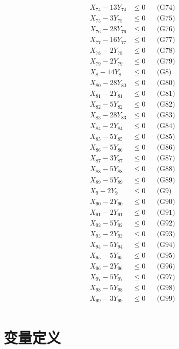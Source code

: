 \documentclass[a4paper,10pt]{article}
\begin{document}
{\begin{align}
X_{74} - 13Y_{74} &\leq 0 && \text{(G74)} \\
X_{75} - 3Y_{75} &\leq 0 && \text{(G75)} \\
X_{76} - 28Y_{76} &\leq 0 && \text{(G76)} \\
X_{77} - 16Y_{77} &\leq 0 && \text{(G77)} \\
X_{78} - 2Y_{78} &\leq 0 && \text{(G78)} \\
X_{79} - 2Y_{79} &\leq 0 && \text{(G79)} \\
X_{8} - 14Y_{8} &\leq 0 && \text{(G8)} \\
X_{80} - 28Y_{80} &\leq 0 && \text{(G80)} \\
\allowbreak
X_{81} - 2Y_{81} &\leq 0 && \text{(G81)} \\
X_{82} - 5Y_{82} &\leq 0 && \text{(G82)} \\
X_{83} - 28Y_{83} &\leq 0 && \text{(G83)} \\
X_{84} - 2Y_{84} &\leq 0 && \text{(G84)} \\
X_{85} - 5Y_{85} &\leq 0 && \text{(G85)} \\
X_{86} - 5Y_{86} &\leq 0 && \text{(G86)} \\
X_{87} - 3Y_{87} &\leq 0 && \text{(G87)} \\
X_{88} - 5Y_{88} &\leq 0 && \text{(G88)} \\
X_{89} - 5Y_{89} &\leq 0 && \text{(G89)} \\
X_{9} - 2Y_{9} &\leq 0 && \text{(G9)} \\
X_{90} - 2Y_{90} &\leq 0 && \text{(G90)} \\
X_{91} - 2Y_{91} &\leq 0 && \text{(G91)} \\
X_{92} - 5Y_{92} &\leq 0 && \text{(G92)} \\
X_{93} - 2Y_{93} &\leq 0 && \text{(G93)} \\
X_{94} - 5Y_{94} &\leq 0 && \text{(G94)} \\
X_{95} - 5Y_{95} &\leq 0 && \text{(G95)} \\
X_{96} - 2Y_{96} &\leq 0 && \text{(G96)} \\
X_{97} - 5Y_{97} &\leq 0 && \text{(G97)} \\
X_{98} - 5Y_{98} &\leq 0 && \text{(G98)} \\
X_{99} - 3Y_{99} &\leq 0 && \text{(G99)} \\
\allowbreak
\end{align}}

\section{变量定义}
\end{document}

